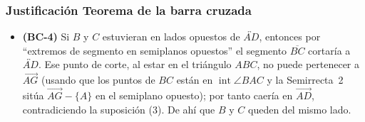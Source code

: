 \documentclass[12pt,letterpaper]{exam}
\begin{document}
\subsubsection*{Justificación Teorema de la barra cruzada}
\begin{itemize}[leftmargin=2.2em]
  \item \textbf{(BC-4)} \; Si $B$ y $C$ estuvieran en lados opuestos de $\overleftrightarrow{AD}$, entonces por ``extremos de segmento en semiplanos opuestos'' el segmento $\overline{BC}$ cortaría a $\overleftrightarrow{AD}$. Ese punto de corte, al estar en el triángulo $ABC$, no puede pertenecer a $\overrightarrow{AG}$ (usando que los puntos de $BC$ están en $\operatorname{int}\angle BAC$ y la Semirrecta~2 sitúa $\overrightarrow{AG}-\{A\}$ en el semiplano opuesto); por tanto caería en $\overrightarrow{AD}$, contradiciendo la suposición (3). De ahí que $B$ y $C$ queden del mismo lado.
\end{itemize}
\end{document}
